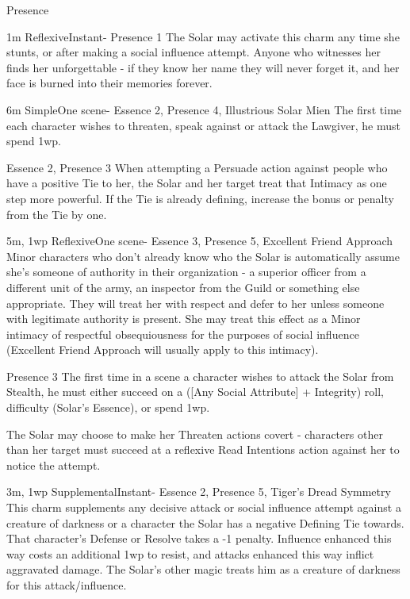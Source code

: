 \begin{Ability}{Presence}

  {1m}
  {Reflexive}{Instant}{-}
  {Presence 1}
  The Solar may activate this charm any time she stunts, or after making a social influence attempt. Anyone who witnesses her finds her unforgettable - if they know her name they will never forget it, and her face is burned into their memories forever.

  {6m}
  {Simple}{One scene}{-}
  {Essence 2, Presence 4, Illustrious Solar Mien}
  The first time each character wishes to threaten, speak against or attack the Lawgiver, he must spend 1wp.

  {Essence 2, Presence 3}
  When attempting a Persuade action against people who have a positive Tie to her, the Solar and her target treat that Intimacy as one step more powerful. If the Tie is already defining, increase the bonus or penalty from the Tie by one.

  {5m, 1wp}
  {Reflexive}{One scene}{-}
  {Essence 3, Presence 5, Excellent Friend Approach}
  Minor characters who don't already know who the Solar is automatically assume she's someone of authority in their organization - a superior officer from a different unit of the army, an inspector from the Guild or something else appropriate. They will treat her with respect and defer to her unless someone with legitimate authority is present. She may treat this effect as a Minor intimacy of respectful obsequiousness for the purposes of social influence (Excellent Friend Approach will usually apply to this intimacy).

  {Presence 3}
  The first time in a scene a character wishes to attack the Solar from Stealth, he must either succeed on a ([Any Social Attribute] + Integrity) roll, difficulty (Solar's Essence), or spend 1wp.

  The Solar may choose to make her Threaten actions covert - characters other than her target must succeed at a reflexive Read Intentions action against her to notice the attempt.

  {3m, 1wp}
  {Supplemental}{Instant}{-}
  {Essence 2, Presence 5, Tiger's Dread Symmetry}
  This charm supplements any decisive attack or social influence attempt against a creature of darkness or a character the Solar has a negative Defining Tie towards. That character's Defense or Resolve takes a -1 penalty. Influence enhanced this way costs an additional 1wp to resist, and attacks enhanced this way inflict aggravated damage. The Solar's other magic treats him as a creature of darkness for this attack/influence.


\end{Ability}
